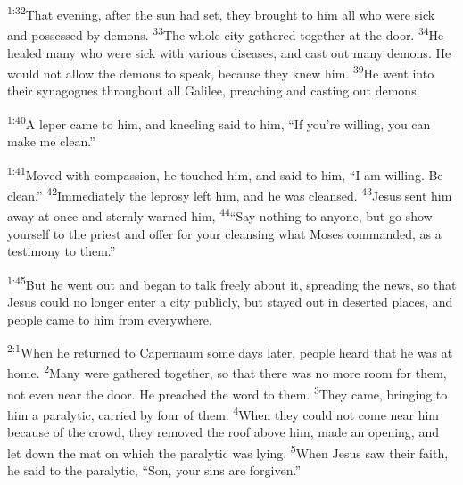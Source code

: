 \documentclass[openany,12pt,english]{book}
\newenvironment{para}{\par\pretolerance=100\tolerance=200\setlength{\emergencystretch}{0.6em}\relax}{\par}
\begin{document}
\begin{para}
    \textsuperscript{1:32}\thinspace{}That eve\-ning, af\-ter the sun had set, they brought to him all who were sick and pos\-sessed by demons.
    \textsuperscript{33}\thinspace{}The whole cit\-y gathered to\-geth\-er at the door.
    \textsuperscript{34}\thinspace{}He healed man\-y who were sick with var\-i\-ous diseases, and cast out man\-y demons. He would not al\-low the demons to speak, be\-cause they knew him.
    \textsuperscript{39}\thinspace{}He went in\-to their synagogues through\-out all Gal\-i\-lee, preaching and cast\-ing out demons.
\end{para}

\bigskip{}

\begin{para}
    \textsuperscript{1:40}\thinspace{}A lep\-er came to him, and kneel\-ing said to him, “If you're will\-ing, you can make me clean.”
\end{para}

\begin{para}
    \textsuperscript{1:41}\thinspace{}Moved with com\-pas\-sion, he touched him, and said to him, “I am will\-ing. Be clean.”
    \textsuperscript{42}\thinspace{}Im\-me\-di\-ate\-ly the lep\-ro\-sy left him, and he was cleansed.
    \textsuperscript{43}\thinspace{}Jesus sent him a\-way at once and sternly warned him,
    \textsuperscript{44}\thinspace{}“Say noth\-ing to any\-one, but go show your\-self to the priest and of\-fer for your cleans\-ing what Mo\-ses commanded, as a tes\-ti\-mo\-ny to them.”
\end{para}

\begin{para}
    \textsuperscript{1:45}\thinspace{}But he went out and be\-gan to talk free\-ly a\-bout it, spreading the news, so that Jesus could no long\-er en\-ter a cit\-y pub\-lic\-ly, but stayed out in de\-sert\-ed places, and peo\-ple came to him from eve\-ry\-where.
\end{para}

\bigskip{}

\begin{para}
    \textsuperscript{2:1}\thinspace{}When he returned to Capernaum some days lat\-er, peo\-ple heard that he was at home.
    \textsuperscript{2}\thinspace{}Man\-y were gathered to\-geth\-er, so that there was no more room for them, not e\-ven near the door. He preached the word to them.
    \textsuperscript{3}\thinspace{}They came, bring\-ing to him a par\-a\-lyt\-ic, car\-ried by four of them.
    \textsuperscript{4}\thinspace{}When they could not come near him be\-cause of the crowd, they re\-moved the roof a\-bove him, made an o\-pen\-ing, and let down the mat on which the par\-a\-lyt\-ic was ly\-ing.
    \textsuperscript{5}\thinspace{}When Jesus saw their faith, he said to the par\-a\-lyt\-ic, “Son, your sins are for\-giv\-en.”
\end{para}
\end{document}
